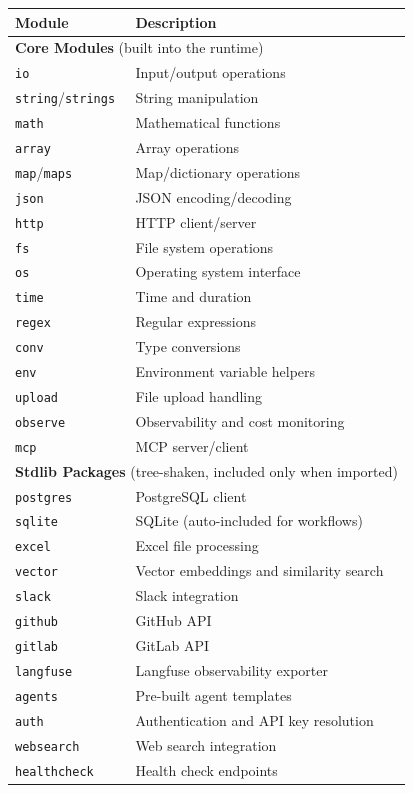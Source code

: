 \documentclass[11pt,a4paper]{book}
\newcommand{\code}[1]{\texttt{#1}}
\begin{document}
\begin{longtable}{ll}
\toprule
\textbf{Module} & \textbf{Description} \\
\midrule
\endhead
\multicolumn{2}{l}{\textbf{Core Modules} (built into the runtime)} \\
\midrule
\code{io} & Input/output operations \\
\code{string}/\code{strings} & String manipulation \\
\code{math} & Mathematical functions \\
\code{array} & Array operations \\
\code{map}/\code{maps} & Map/dictionary operations \\
\code{json} & JSON encoding/decoding \\
\code{http} & HTTP client/server \\
\code{fs} & File system operations \\
\code{os} & Operating system interface \\
\code{time} & Time and duration \\
\code{regex} & Regular expressions \\
\code{conv} & Type conversions \\
\code{env} & Environment variable helpers \\
\code{upload} & File upload handling \\
\code{observe} & Observability and cost monitoring \\
\code{mcp} & MCP server/client \\
\midrule
\multicolumn{2}{l}{\textbf{Stdlib Packages} (tree-shaken, included only when imported)} \\
\midrule
\code{postgres} & PostgreSQL client \\
\code{sqlite} & SQLite (auto-included for workflows) \\
\code{excel} & Excel file processing \\
\code{vector} & Vector embeddings and similarity search \\
\code{slack} & Slack integration \\
\code{github} & GitHub API \\
\code{gitlab} & GitLab API \\
\code{langfuse} & Langfuse observability exporter \\
\code{agents} & Pre-built agent templates \\
\code{auth} & Authentication and API key resolution \\
\code{websearch} & Web search integration \\
\code{healthcheck} & Health check endpoints \\
\bottomrule
\end{longtable}

\end{document}
